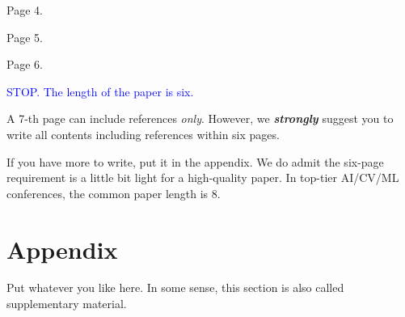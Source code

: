 \documentclass{article}
\begin{document}




\clearpage
Page 4.

\clearpage
Page 5.

\clearpage
Page 6.

\clearpage
\textcolor{blue}{STOP. The length of the paper is six.}

A 7-th page can include references \textit{only}. However, we \textit{\textbf{strongly}} suggest you to
write all contents including references within six pages.

If you have more to write, put it in the appendix. We do admit the six-page requirement is a little bit light for a high-quality paper. In top-tier AI/CV/ML conferences, the common paper length is 8.

\clearpage
\section*{Appendix}
Put whatever you like here. In some sense, this section is also called supplementary material.
\end{document}
